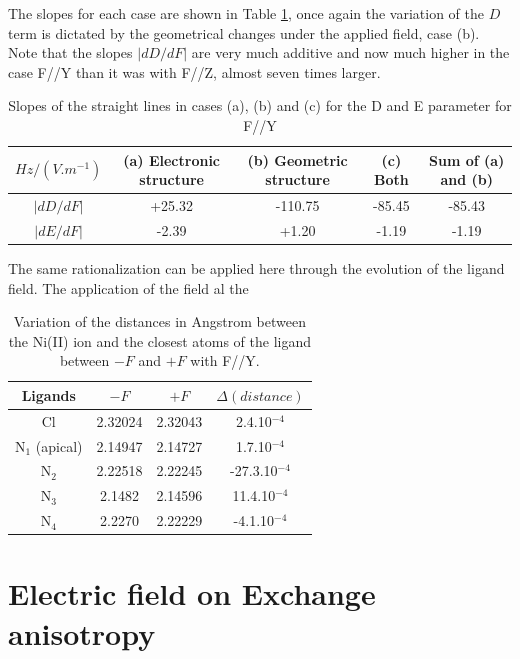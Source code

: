 \documentclass[10pt]{report}
\numberwithin{equation}{section}
\begin{document}
The slopes for each case are shown in Table \ref{tab:Slope_D_Y}, once again the variation of the $D$ term is dictated by the geometrical changes under the applied field, case (b).
Note that the slopes $|dD/dF|$ are very much additive and now much higher in the case F//Y than it was with F//Z, almost seven times larger.
\begin{table}[!h]
    \begin{tabular}{c | c c c c}
        \hline
        $Hz/(V.m^{-1})$ &  (a) Electronic structure & (b) Geometric structure & (c) Both & Sum of (a) and (b)\\
        \hline
        $|dD/dF|$ & +25.32	& -110.75 & 	-85.45 & 	-85.43\\
        $|dE/dF|$ &-2.39& 	+1.20& 	-1.19& 	-1.19\\
    \end{tabular}
    \caption{Slopes of the straight lines in cases (a), (b) and (c) for the D and E parameter for F//Y}
    \label{tab:Slope_D_Y}
\end{table}

The same rationalization can be applied here through the evolution of the ligand field.
The application of the field al the 

\begin{table}[h!]
    \centering
    \begin{tabular}{| c | c| c | c |}
        \hline
        Ligands & $-F$ & $+F$ &$\Delta(distance)$\\
        \hline
        Cl & 2.32024& 2.32043&  2.4.10$^{-4}$\\
        N$_1$ (apical) & 2.14947  & 2.14727 &1.7.10$^{-4}$\\
        N$_2$ & 2.22518& 2.22245&-27.3.10$^{-4}$ \\
        N$_3$ & 2.1482& 2.14596&11.4.10$^{-4}$ \\
        N$_4$ & 2.2270& 2.22229 &-4.1.10$^{-4}$\\
        \hline
    \end{tabular}
    \caption{Variation of the distances in Angstrom between the Ni(II) ion and the closest atoms of the ligand between $-F$ and $+F$ with F//Y.}
    \label{tab:DistanceY}
\end{table}

\chapter{Electric field on Exchange anisotropy}\label{chap:Cu2Cl5}
\end{document}
